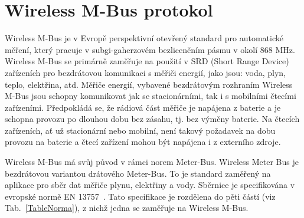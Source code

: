\chapter{Wireless M-Bus protokol}
Wireless M-Bus je v Evropě perspektivní otevřený standard pro automatické měření, který pracuje v subgi-gaherzovém bezlicenčním pásmu v okolí 868 MHz. Wireless M-Bus se primárně zaměřuje na použití v SRD (Short Range Device) zařízeních pro bezdrátovou komunikaci s měřiči energií, jako jsou: voda, plyn, teplo, elektřina, atd. Měřiče energií, vybavené bezdrátovým rozhraním Wireless M-Bus jsou schopny komunikovat jak se stacionárními, tak i s mobilními čtecími zařízeními. Předpokládá se, že rádiová část měřiče je napájena z baterie a je schopna provozu po dlouhou dobu bez zásahu, tj. bez výměny baterie. Na čtecích zařízeních, ať už stacionární nebo mobilní, není takový požadavek na dobu provozu na baterie a čtecí zařízení mohou být napájena i z externího zdroje.

Wireless M-Bus má svůj původ v rámci norem Meter-Bus. Wireless Meter Bus je bezdrátovou variantou drátového Meter-Bus. To je standard zaměřený na aplikace pro sběr dat měřiče plynu, elektřiny a vody. Sběrnice je specifikována v evropské normě EN 13757~\cite{Norma1}. Tato specifikace je rozdělena do pěti částí (viz Tab.~\ref{TableNorma}), z nichž jedna se zaměřuje na Wireless M-Bus.

